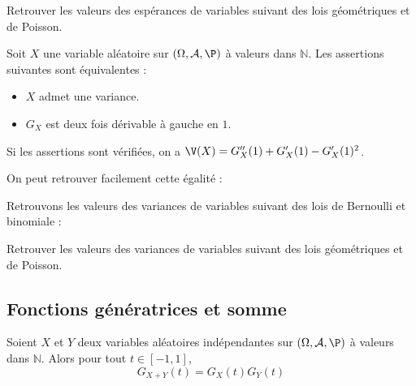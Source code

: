 \documentclass[a4paper,10pt]{report}
\begin{document}
\begin{exa} Retrouver les valeurs des espérances de variables suivant des lois géométriques et de Poisson.
\end{exa}
\begin{prop} Soit $X$ une variable aléatoire sur $(\Omega, \mathcal{A}, \P)$ à valeurs dans $\mathbb{N}$. Les assertions suivantes sont équivalentes :

\begin{itemize}
\item $X$ admet une variance.
\item $G_X$ est deux fois dérivable à gauche en $1$.
\end{itemize}
Si les assertions sont vérifiées, on a $\V(X)=G_X''(1)+G_X'(1)-G_X'(1)^2$.
\end{prop}

\begin{rem} On peut retrouver facilement cette égalité :

\vspace{4cm}
\end{rem}

\begin{ex} Retrouvons les valeurs des variances de variables suivant des lois de Bernoulli et binomiale :

\vspace{5cm}
\end{ex}

\begin{exa} Retrouver les valeurs des variances de variables suivant des lois géométriques et de Poisson.
\end{exa}

\subsection{Fonctions génératrices et somme}

\begin{prop}
Soient $X$ et $Y$ deux variables aléatoires indépendantes sur $(\Omega, \mathcal{A}, \P)$ à valeurs dans $\mathbb{N}$. Alors pour tout $t \in [-1,1]$,
$$ G_{X+Y}(t) = G_X(t) G_Y(t)$$
\end{prop}

\begin{preuve}

\vspace{3cm}
\end{preuve}
\end{document}
